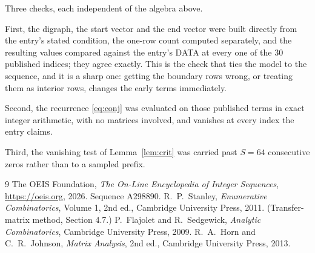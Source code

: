 \documentclass[11pt,a4paper]{article}
\theoremstyle{plain}
\theoremstyle{definition}
\begin{document}
Three checks, each independent of the algebra above.

First, the digraph, the start vector and the end vector were built directly from the
entry's stated condition, the one-row count computed separately, and the resulting values
compared against the entry's DATA at every one of the $30$ published indices; they
agree exactly. This is the check that ties the model to the sequence, and it is a sharp one:
getting the boundary rows wrong, or treating them as interior rows, changes the early terms
immediately.

Second, the recurrence \eqref{eq:conj} was evaluated on those published terms in exact
integer arithmetic, with no matrices involved, and vanishes at every index the entry claims.

Third, the vanishing test of Lemma~\ref{lem:crit} was carried past $S=64$ consecutive
zeros rather than to a sampled prefix.

\begin{thebibliography}{9}
 The OEIS Foundation, \emph{The On-Line Encyclopedia of Integer
Sequences}, \url{https://oeis.org}, 2026. Sequence A298890.
 R.~P.~Stanley, \emph{Enumerative Combinatorics}, Volume 1, 2nd ed.,
Cambridge University Press, 2011. (Transfer-matrix method, Section 4.7.)
 P.~Flajolet and R.~Sedgewick, \emph{Analytic Combinatorics}, Cambridge
University Press, 2009.
 R.~A.~Horn and C.~R.~Johnson, \emph{Matrix Analysis}, 2nd ed., Cambridge
University Press, 2013.
\end{thebibliography}
\end{document}
